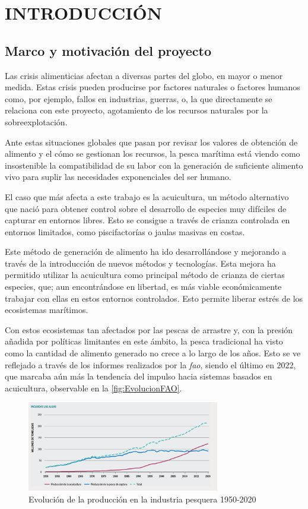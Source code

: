 \section{INTRODUCCIÓN}

\subsection{Marco y motivación del proyecto}

Las crisis alimenticias afectan a diversas partes del globo, en mayor o menor medida. Estas crisis pueden producirse por factores naturales o factores humanos como, por ejemplo, 
fallos en industrias, guerras, o, la que directamente se relaciona con este proyecto, agotamiento de los recursos naturales por la sobreexplotación.

Ante estas situaciones globales que pasan por revisar los valores de obtención de alimento y el cómo se gestionan los recursos, la pesca marítima está viendo como insostenible la 
compatibilidad de su labor con la generación de suficiente alimento vivo para suplir las necesidades exponenciales del ser humano.

El caso que más afecta a este trabajo es la acuicultura, un método alternativo que nació para obtener control sobre el desarrollo de especies muy difíciles de capturar en entornos 
libres. Esto se consigue a través de crianza controlada en entornos limitados, como piscifactorías o jaulas masivas en costas.

Este método de generación de alimento ha ido desarrollándose y mejorando a través de la introducción de nuevos métodos y tecnologías. Esta mejora ha permitido utilizar la acuicultura 
como principal método de crianza de ciertas especies, que; aun encontrándose en libertad, es más viable económicamente trabajar con ellas en estos entornos controlados. Esto permite liberar 
estrés de los ecosistemas marítimos.

Con estos ecosistemas tan afectados por las pescas de arrastre y, con la presión añadida por políticas limitantes en este ámbito, la pesca tradicional ha visto como la cantidad de alimento 
generado no crece a lo largo de los años. Esto se ve reflejado a través de los informes realizados por la \textit{\acrfull{fao}}, siendo el último en 2022, que marcaba aún más la tendencia del 
impulso hacia sistemas basados en acuicultura, observable en la \autoref{fig:EvolucionFAO}.

\begin{figure}[h]
    \centering
    \includegraphics[width=0.75\textwidth]{images/2/EvolucionFAO.png}
    \caption{Evolución de la producción en la industria pesquera 1950-2020\cite{EstadoMundialPesca}}
    \label{fig:EvolucionFAO}
\end{figure}

